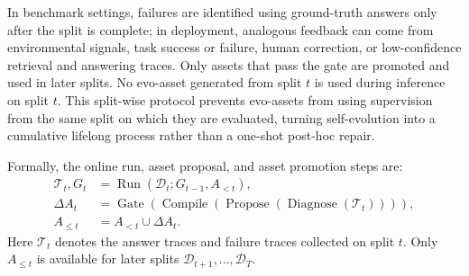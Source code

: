 
In benchmark settings, failures are identified using ground-truth answers only after the split is complete; in deployment, analogous feedback can come from environmental signals, task success or failure, human correction, or low-confidence retrieval and answering traces.
Only assets that pass the gate are promoted and used in later splits.
No evo-asset generated from split $t$ is used during inference on split $t$.
This split-wise protocol prevents evo-assets from using supervision from the same split on which they are evaluated, turning self-evolution into a cumulative lifelong process rather than a one-shot post-hoc repair.

Formally, the online run, asset proposal, and asset promotion steps are:
\begin{align}
    \mathcal{T}_t, G_t
    &= \operatorname{Run}(\mathcal{D}_t; G_{t-1}, A_{<t}), \\
    \Delta A_t
    &= \operatorname{Gate}\!\left(
        \operatorname{Compile}\!\left(
        \operatorname{Propose}\!\left(
        \operatorname{Diagnose}(\mathcal{T}_t)
        \right)\right)\right), \\
    A_{\leq t}
    &= A_{<t} \cup \Delta A_t .
    \label{eq:self_evo_update}
\end{align}
Here $\mathcal{T}_t$ denotes the answer traces and failure traces collected on split $t$.
Only $A_{\leq t}$ is available for later splits $\mathcal{D}_{t+1},\ldots,\mathcal{D}_T$.

